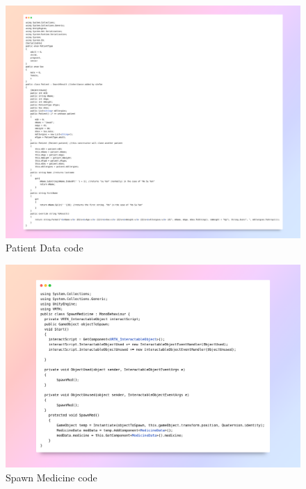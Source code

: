 \begin{figure}[ht]
	\centering
	\includegraphics[width=1\linewidth, height=1\linewidth]{Images/patient.png}
	\caption{Patient Data code}
\end{figure}

\begin{figure}[ht]
	\centering
	\includegraphics[width=1\linewidth, height=1\linewidth]{Images/SpwanMedicine.png}
	\caption{Spawn Medicine code}
\end{figure}


